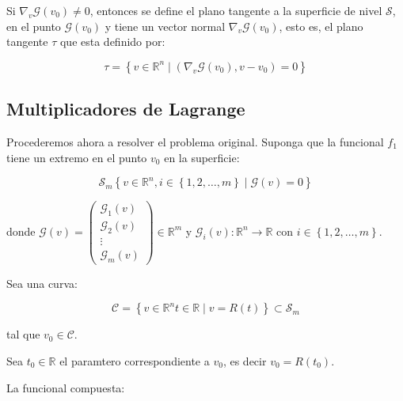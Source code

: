                 Si $\nabla_v \mathscr{G}(v_0) \ne 0$, entonces se define el plano tangente a la superficie de nivel $\mathscr{S}$, en el punto $\mathscr{G}(v_0)$ y tiene un vector normal $\nabla_v \mathscr{G}(v_0)$, esto es, el plano tangente $\tau$ que esta definido por:

                \begin{equation}
                    \tau = \left\{ v \in \mathbb{R}^n \mid \left( \nabla_v \mathscr{G}(v_0), v - v_0 \right) = 0 \right\}
                \end{equation}


        \subsection{Multiplicadores de Lagrange}

            Procederemos ahora a resolver el problema original. Suponga que la funcional $f_1$ tiene un extremo en el punto $v_0$ en la superficie:

            \begin{equation}
                \mathscr{S}_m \left\{ v \in \mathbb{R}^n, i \in \left\{ 1, 2, \dots, m \right\} \mid \mathscr{G}(v) = 0 \right\}
            \end{equation}

            donde $\mathscr{G}(v) = \begin{pmatrix} \mathscr{G}_1(v) \\ \mathscr{G}_2(v) \\ \vdots \\ \mathscr{G}_m(v) \end{pmatrix} \in \mathbb{R}^m$
                y $\mathscr{G}_i(v):\mathbb{R}^n \to \mathbb{R}$
                con $i \in \left\{ 1,2,\dots,m \right\}$.

            Sea una curva:

            \begin{equation}
                \mathscr{C} = \left\{ v\in \mathbb{R}^n t \in \mathbb{R} \mid v = R(t) \right\} \subset \mathscr{S}_m
            \end{equation}

            tal que $v_0 \in \mathscr{C}$.

            Sea $t_0 \in \mathbb{R}$ el paramtero correspondiente a $v_0$, es decir $v_0 = R(t_0)$.

            La funcional compuesta:

